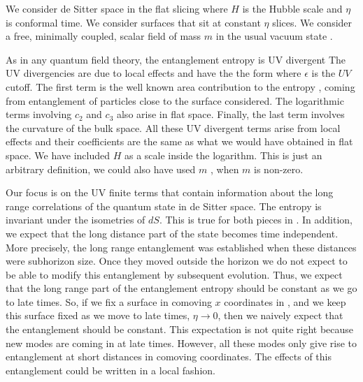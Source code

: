 

We consider de Sitter space in the flat slicing
\eqn{}
where $H$ is the Hubble scale and $\eta$ is conformal time.
We   consider surfaces that sit at constant $\eta$ slices.  We consider a free, minimally coupled,
scalar field of mass $m$ in the usual vacuum state .

As in any quantum field theory, the entanglement entropy is UV divergent
\eqn{} The UV divergencies are
due to local effects and have the the form
\eqn{}
where $\epsilon$ is the $UV$ cutoff. The first term is the well known area contribution to the entropy , coming from entanglement of particles close to the surface considered.
The logarithmic terms involving $c_2$ and $c_3$  also arise in flat space. Finally, the last term
 involves the curvature of the bulk space. All these UV divergent terms arise
from local effects and their coefficients are the same as what we would have obtained in flat space.
We have included $H$ as a scale inside the logarithm.
This is just an arbitrary definition, we could also have used $m$ \HertzbergUV, when $m$ is non-zero.

Our focus  is on the UV finite terms that contain information about the long range correlations of
the quantum state in de Sitter space.
The entropy is invariant under the isometries of $dS$. This is true for both pieces in \entropy .
In addition, we expect that  the long distance part of the state becomes time independent.
 More precisely, the long range entanglement  was
established when these distances were subhorizon size. Once they moved outside the horizon
we do not expect to be able to modify this entanglement by subsequent evolution.
Thus, we expect that the long range part of the entanglement entropy should be constant as we go
to late times. So, if we fix a surface in comoving $x$ coordinates in \poinc , and
we keep this surface fixed as we move to late times, $\eta \to 0$, then we naively expect that
the entanglement should be constant. This expectation is not quite right because new modes are
coming in at late times. However, all these modes only give rise to entanglement at short distances in
comoving coordinates. The effects of this entanglement could be written in a local fashion.

